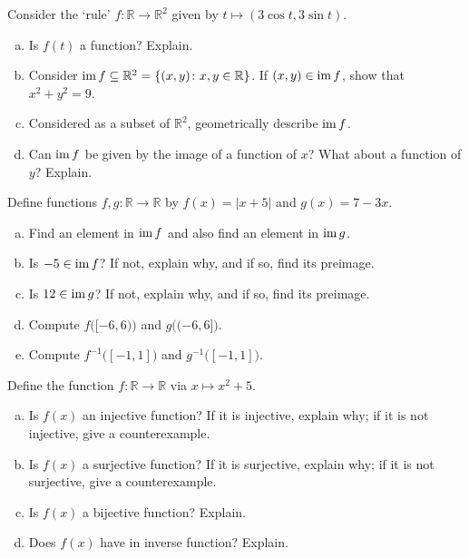 \documentclass[12pt,letterpaper]{exam}
\begin{document}
\examtitle
{} 
\scores
\bottomline
\newpage

\begin{questions}

\newpage
\question[10] Consider the `rule' $f: \mathbb{R} \to \mathbb{R}^2$ given by $t \mapsto (3\cos t, 3\sin t)$.
	\begin{enumerate}[(a)]
	\item Is $f(t)$ a function? Explain.
	\item Consider $\operatorname{im} f \subseteq \mathbb{R}^2= \{ (x, y) \colon x, y \in \mathbb{R} \}$. If $(x, y) \in \operatorname{im} f$, show that $x^2 + y^2= 9$. 
	\item Considered as a subset of $\mathbb{R}^2$, geometrically describe $\operatorname{im} f$. 
	\item Can $\operatorname{im} f$ be given by the image of a function of $x$? What about a function of $y$? Explain. 
	\end{enumerate}



\newpage
\question[10] Define functions $f, g: \mathbb{R} \to \mathbb{R}$ by $f(x)= |x + 5|$ and $g(x)= 7 - 3x$.
	\begin{enumerate}[(a)]
	\item Find an element in $\operatorname{im} f$ and also find an element in $\operatorname{im} g$. 
	\item Is $-5 \in \operatorname{im} f$? If not, explain why, and if so, find its preimage. 
	\item Is $12 \in \operatorname{im} g$? If not, explain why, and if so, find its preimage. 
	\item Compute $f\big( [-6, 6) \big)$ and $g\big( (-6, 6] \big)$. 
	\item Compute $f^{-1} \big( [-1,1] \big)$ and $g^{-1} \big( [-1, 1] \big)$.
	\end{enumerate}



\newpage
\question[10] Define the function $f: \mathbb{R} \to \mathbb{R}$ via $x \mapsto x^2 + 5$. 
	\begin{enumerate}[(a)]
	\item Is $f(x)$ an injective function? If it is injective, explain why; if it is not injective, give a counterexample. 
	\item Is $f(x)$ a surjective function? If it is surjective, explain why; if it is not surjective, give a counterexample. 
	\item Is $f(x)$ a bijective function? Explain. 
	\item Does $f(x)$ have in inverse function? Explain. 
	\end{enumerate}




\end{questions}
\end{document}
